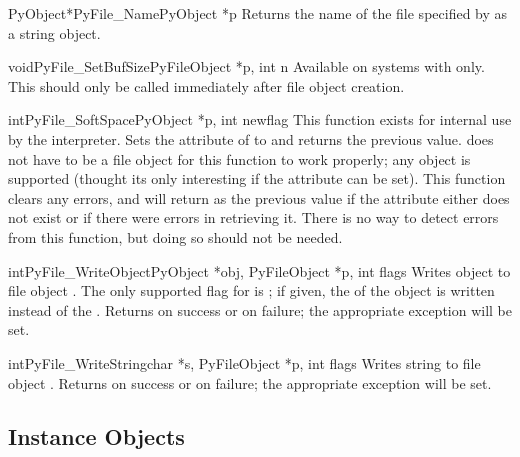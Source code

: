 \documentclass{manual}
\begin{document}
\begin{cfuncdesc}{PyObject*}{PyFile_Name}{PyObject *p}
Returns the name of the file specified by  as a string object.
\end{cfuncdesc}

\begin{cfuncdesc}{void}{PyFile_SetBufSize}{PyFileObject *p, int n}
Available on systems with 
only.  This should only be called immediately after file object
creation.
\end{cfuncdesc}

\begin{cfuncdesc}{int}{PyFile_SoftSpace}{PyObject *p, int newflag}
This function exists for internal use by the interpreter.
Sets the  attribute of  to  and
returns the
previous value.   does not have to be a file object
for this function to work properly; any object is supported (thought
its only interesting if the  attribute can be set).
This function clears any errors, and will return  as the
previous value if the attribute either does not exist or if there were
errors in retrieving it.  There is no way to detect errors from this
function, but doing so should not be needed.
\end{cfuncdesc}

\begin{cfuncdesc}{int}{PyFile_WriteObject}{PyObject *obj, PyFileObject *p,
                                           int flags}
Writes object  to file object .  The only supported
flag for  is ;
if given, the  of the object is written instead of the 
.  Returns  on success or  on
failure; the appropriate exception will be set.
\end{cfuncdesc}

\begin{cfuncdesc}{int}{PyFile_WriteString}{char *s, PyFileObject *p,
                                           int flags}
Writes string  to file object .  Returns  on
success or  on failure; the appropriate exception will be
set.
\end{cfuncdesc}


\subsection{Instance Objects \label{instanceObjects}}
\end{document}
